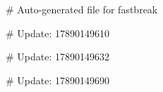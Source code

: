 # Auto-generated file for fastbreak

# Update: 17890149610

# Update: 17890149632

# Update: 17890149690
